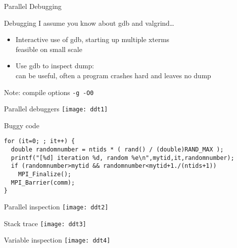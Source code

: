  {Parallel Debugging}

\begin{numberedframe}{Debugging}
  I assume you know about gdb and valgrind\ldots
  \begin{itemize}
  \item Interactive use of gdb, starting up multiple xterms\\
    feasible on small scale
  \item Use gdb to inspect dump:\\
    can be useful, often a program crashes hard and leaves no dump
  \end{itemize}
  Note: compile options \texttt{-g -O0}
\end{numberedframe}

\begin{numberedframe}{Parallel debuggers}
\texttt{[image: ddt1]}
\end{numberedframe}

\begin{numberedframe}{Buggy code}
\begin{verbatim}
for (it=0; ; it++) {
  double randomnumber = ntids * ( rand() / (double)RAND_MAX );
  printf("[%d] iteration %d, random %e\n",mytid,it,randomnumber);
  if (randomnumber>mytid && randomnumber<mytid+1./(ntids+1))  
    MPI_Finalize();
  MPI_Barrier(comm);
}
\end{verbatim}
\end{numberedframe}

\begin{numberedframe}{Parallel inspection}
\texttt{[image: ddt2]}
\end{numberedframe}

\begin{numberedframe}{Stack trace}
  \texttt{[image: ddt3]}
\end{numberedframe}

\begin{numberedframe}{Variable inspection}
  \texttt{[image: ddt4]}
\end{numberedframe}

